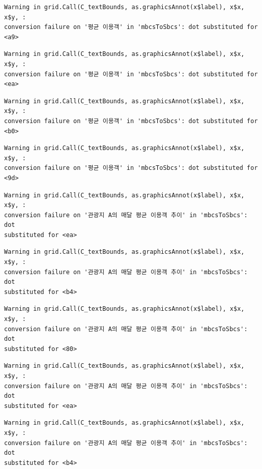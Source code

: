 \documentclass[
  letterpaper,
  DIV=11,
  numbers=noendperiod]{scrreprt}
\begin{document}
\begin{verbatim}
Warning in grid.Call(C_textBounds, as.graphicsAnnot(x$label), x$x, x$y, :
conversion failure on '평균 이용객' in 'mbcsToSbcs': dot substituted for <a9>
\end{verbatim}

\begin{verbatim}
Warning in grid.Call(C_textBounds, as.graphicsAnnot(x$label), x$x, x$y, :
conversion failure on '평균 이용객' in 'mbcsToSbcs': dot substituted for <ea>
\end{verbatim}

\begin{verbatim}
Warning in grid.Call(C_textBounds, as.graphicsAnnot(x$label), x$x, x$y, :
conversion failure on '평균 이용객' in 'mbcsToSbcs': dot substituted for <b0>
\end{verbatim}

\begin{verbatim}
Warning in grid.Call(C_textBounds, as.graphicsAnnot(x$label), x$x, x$y, :
conversion failure on '평균 이용객' in 'mbcsToSbcs': dot substituted for <9d>
\end{verbatim}

\begin{verbatim}
Warning in grid.Call(C_textBounds, as.graphicsAnnot(x$label), x$x, x$y, :
conversion failure on '관광지 A의 매달 평균 이용객 추이' in 'mbcsToSbcs': dot
substituted for <ea>
\end{verbatim}

\begin{verbatim}
Warning in grid.Call(C_textBounds, as.graphicsAnnot(x$label), x$x, x$y, :
conversion failure on '관광지 A의 매달 평균 이용객 추이' in 'mbcsToSbcs': dot
substituted for <b4>
\end{verbatim}

\begin{verbatim}
Warning in grid.Call(C_textBounds, as.graphicsAnnot(x$label), x$x, x$y, :
conversion failure on '관광지 A의 매달 평균 이용객 추이' in 'mbcsToSbcs': dot
substituted for <80>
\end{verbatim}

\begin{verbatim}
Warning in grid.Call(C_textBounds, as.graphicsAnnot(x$label), x$x, x$y, :
conversion failure on '관광지 A의 매달 평균 이용객 추이' in 'mbcsToSbcs': dot
substituted for <ea>
\end{verbatim}

\begin{verbatim}
Warning in grid.Call(C_textBounds, as.graphicsAnnot(x$label), x$x, x$y, :
conversion failure on '관광지 A의 매달 평균 이용객 추이' in 'mbcsToSbcs': dot
substituted for <b4>
\end{verbatim}
\end{document}
